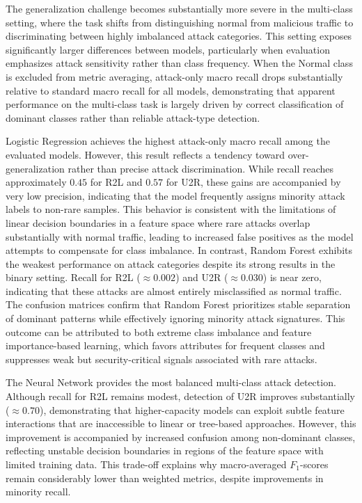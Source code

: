 The generalization challenge becomes substantially more severe in the multi-class setting, where the task shifts from distinguishing normal from malicious traffic to discriminating 
between highly imbalanced attack categories. This setting exposes significantly larger differences between models, particularly when evaluation emphasizes attack sensitivity 
rather than class frequency. When the Normal class is excluded from metric averaging, attack-only macro recall drops substantially relative to standard macro recall for all 
models, demonstrating that apparent performance on the multi-class task is largely driven by correct classification of dominant classes rather than reliable attack-type detection.

Logistic Regression achieves the highest attack-only macro recall among the evaluated models. However, this result reflects a tendency toward over-generalization rather than 
precise attack discrimination. While recall reaches approximately $0.45$ for R2L and $0.57$ for U2R, these gains are accompanied by very low precision, indicating that the 
model frequently assigns minority attack labels to non-rare samples. This behavior is consistent with the limitations of linear decision boundaries in a feature space where 
rare attacks overlap substantially with normal traffic, leading to increased false positives as the model attempts to compensate for class imbalance. In contrast, Random Forest 
exhibits the weakest performance on attack categories despite its strong results in the binary setting. Recall for R2L ($\approx 0.002$) and U2R ($\approx 0.030$) is near zero, 
indicating that these attacks are almost entirely misclassified as normal traffic. The confusion matrices confirm that Random Forest prioritizes stable separation of dominant 
patterns while effectively ignoring minority attack signatures. This outcome can be attributed to both extreme class imbalance and feature importance-based learning, which favors 
attributes for frequent classes and suppresses weak but security-critical signals associated with rare attacks.

The Neural Network provides the most balanced multi-class attack detection. Although recall for R2L remains modest, detection of U2R improves substantially ($\approx 0.70$), 
demonstrating that higher-capacity models can exploit subtle feature interactions that are inaccessible to linear or tree-based approaches. However, this improvement is 
accompanied by increased confusion among non-dominant classes, reflecting unstable decision boundaries in regions of the feature space with limited training data. 
This trade-off explains why macro-averaged $F_{1}$-scores remain considerably lower than weighted metrics, despite improvements in minority recall.

